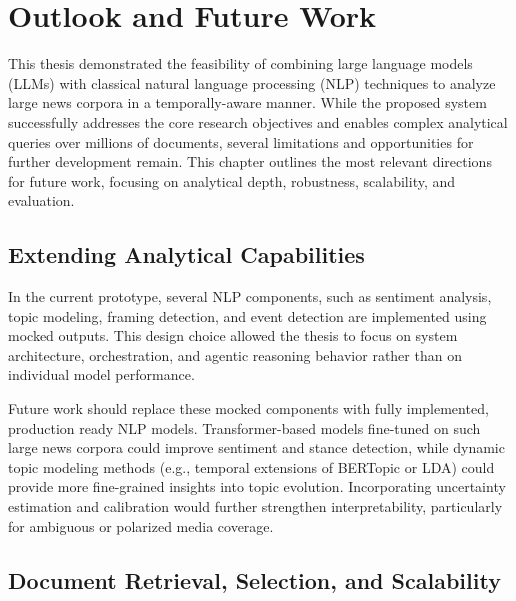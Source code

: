


\chapter{Outlook and Future Work}
\label{ChapterOutlook}

This thesis demonstrated the feasibility of combining large language models (LLMs) with classical natural language processing (NLP) techniques to analyze large news corpora in a temporally-aware manner. While the proposed system successfully addresses the core research objectives and enables complex analytical queries over millions of documents, several limitations and opportunities for further development remain. This chapter outlines the most relevant directions for future work, focusing on analytical depth, robustness, scalability, and evaluation.

\section{Extending Analytical Capabilities}

In the current prototype, several NLP components, such as sentiment analysis, topic modeling, framing detection, and event detection are implemented using mocked outputs. This design choice allowed the thesis to focus on system architecture, orchestration, and agentic reasoning behavior rather than on individual model performance.

Future work should replace these mocked components with fully implemented, production ready NLP models. Transformer-based models fine-tuned on such large news corpora could improve sentiment and stance detection, while dynamic topic modeling methods (e.g., temporal extensions of BERTopic or LDA) could provide more fine-grained insights into topic evolution. Incorporating uncertainty estimation and calibration would further strengthen interpretability, particularly for ambiguous or polarized media coverage.


\section{Document Retrieval, Selection, and Scalability}


